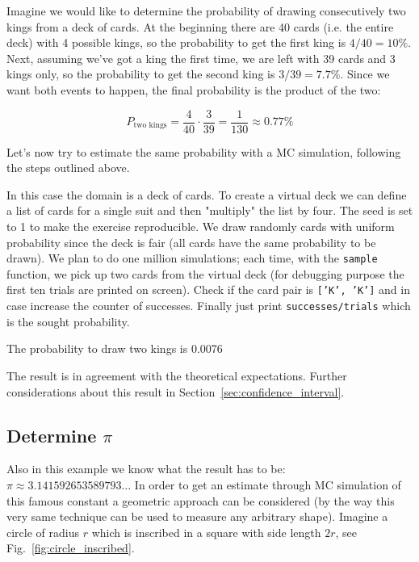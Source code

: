 Imagine we would like to determine the probability of drawing consecutively two kings from a deck of cards. At the beginning there are 40 cards (i.e. the entire deck) with 4 possible kings, so the probability to get the first king is $4/40=10\%$. Next, assuming we've got a king the first time, we are left with 39 cards and 3 kings only, so the probability to get the second king is $3/39=7.7\%$. Since we want both events to happen, the final probability is the product of the two:

\begin{equation*}
P_\textrm{two kings} = \frac{4}{40} \cdot \frac{3}{39} = \frac{1}{130} \approx 0.77\%
\end{equation*}

Let's now try to estimate the same probability with a MC simulation, following the steps outlined above.

In this case the domain is a deck of cards. To create a virtual deck we can define a list of cards for a single suit and then "multiply" the list by four. The seed is set to 1 to make the exercise reproducible.
We draw randomly cards with uniform probability since the deck is fair (all cards have the same probability to be drawn). 
We plan to do one million simulations; each time, with the \texttt{sample} function, we pick up two cards from the virtual deck (for debugging purpose the first ten trials are printed on screen). Check if the card pair is \texttt{['K', 'K']} and in case increase the counter of successes. Finally just print \texttt{successes/trials} which is the sought probability.

\begin{ioutput}
['3' '2']
['2' '3']
['7' '3']
['Q' '4']
['7' '5']
['5' 'J']
['4' 'K']
['K' '2']
['5' 'Q']
['A' 'J']

The probability to draw two kings is 0.0076
\end{ioutput}

The result is in agreement with the theoretical expectations. Further considerations about this result in Section~\ref{sec:confidence_interval}.

\subsection{Determine $\pi$}
\label{determine-pi}

Also in this example we know what the result has to be: $\pi\approx 3.141592653589793\ldots$ In order to get an estimate through MC simulation of this famous constant a geometric approach can be considered (by the way this very same technique can be used to measure any arbitrary shape). Imagine a circle of radius $r$ which is inscribed in a square with side length $2r$, see Fig.~\ref{fig:circle_inscribed}.

